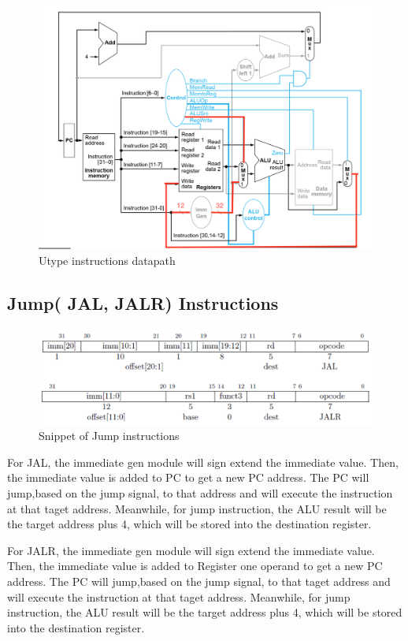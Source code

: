 \documentclass[20pt]{article}
\begin{document}
\begin{figure}[H]
	\includegraphics[width=\linewidth]{RIdatapath}
	\caption{Utype instructions datapath }
\end{figure}

\subsection{Jump( JAL, JALR) Instructions}

\begin{figure}[H]
	\includegraphics[width=\linewidth]{Jump}
	\caption{Snippet of Jump instructions }
\end{figure}

For JAL, the immediate gen module will sign extend the immediate value. Then, the immediate value is added to PC to get a new PC address. The PC will jump,based on the jump signal,  to that address and will execute the instruction at that taget address. Meanwhile, for jump instruction, the ALU result will be the target address plus 4, which will be stored into the destination register. 

For JALR, the immediate gen module will sign extend the immediate value. Then, the immediate value is added to Register one operand to get a new PC address. The PC will jump,based on the jump signal,  to that taget address and will execute the instruction at that taget address. Meanwhile, for jump instruction, the ALU result will be the target address plus 4, which will be stored into the destination register. 
\end{document}
